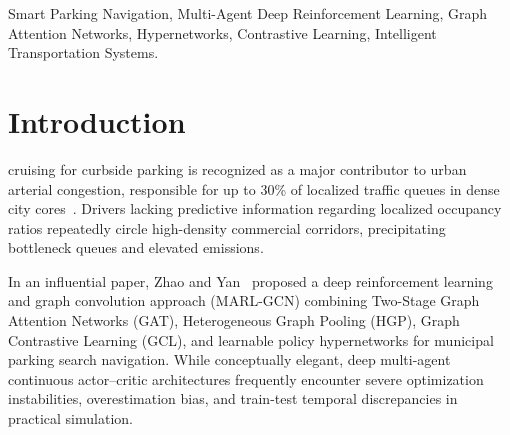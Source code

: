 \documentclass[journal]{IEEEtran}
\begin{document}
\begin{IEEEkeywords}
Smart Parking Navigation, Multi-Agent Deep Reinforcement Learning, Graph Attention Networks, Hypernetworks, Contrastive Learning, Intelligent Transportation Systems.
\end{IEEEkeywords}

\section{Introduction}
 cruising for curbside parking is recognized as a major contributor to urban arterial congestion, responsible for up to 30\% of localized traffic queues in dense city cores~\cite{shoup2006cruising}. Drivers lacking predictive information regarding localized occupancy ratios repeatedly circle high-density commercial corridors, precipitating bottleneck queues and elevated emissions.

In an influential paper, Zhao and Yan~\cite{zhao2025deep} proposed a deep reinforcement learning and graph convolution approach (MARL-GCN) combining Two-Stage Graph Attention Networks (GAT), Heterogeneous Graph Pooling (HGP), Graph Contrastive Learning (GCL), and learnable policy hypernetworks for municipal parking search navigation. While conceptually elegant, deep multi-agent continuous actor--critic architectures frequently encounter severe optimization instabilities, overestimation bias, and train-test temporal discrepancies in practical simulation.
\end{document}
